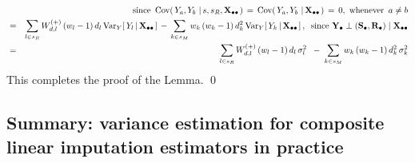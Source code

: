\begin{enumerate}
\begin{eqnarray*}
    &&
        \quad\quad\quad
        \textnormal{since
            \,$
            \textnormal{Cov}\!\left(\,Y_{a},Y_{b}\,\left\vert\,s,s_{R},\mathbf{X}_{\bullet\bullet}\right.\right)
            \,=\,
            \textnormal{Cov}\!\left(\,Y_{a},Y_{b}\,\left\vert\,\mathbf{X}_{\bullet\bullet}\right.\right)
            \,=\,
            0
            $,\, whenever \,$a \neq b$}
    \\
    & = &
        \underset{l \in s_{R}}{\sum}\,
        W^{(+)}_{d,l}\,(w_{l}-1)\,d_{l}\,\textnormal{Var}_{Y}\!\left[\,
            Y_{l}
            \left\vert\,
            \mathbf{X}_{\bullet\bullet}
            \right.
            \right]
        \,-\,
        \underset{k \in s_{M}}{\sum}\,
        w_{k}\,(w_{k}-1)\,d_{k}^{2}\,\textnormal{Var}_{Y}\!\left[\,
            Y_{k}
            \left\vert\,
            \mathbf{X}_{\bullet\bullet}
            \right.
            \right],
        \;\;
        \textnormal{since $\mathbf{Y}_{\bullet} \perp (\mathbf{S}_{\bullet},\mathbf{R}_{\bullet}) \;\vert\; \mathbf{X}_{\bullet\bullet}$}
    \\
    & = &
        \underset{l \in s_{R}}{\sum}\,
        W^{(+)}_{d,l}\,(w_{l}-1)\,d_{l}\,\sigma_{l}^{2}
        \;\;-\;
        \underset{k \in s_{M}}{\sum}\,
        w_{k}\,(w_{k}-1)\,d_{k}^{2}\,\sigma_{k}^{2}
    \end{eqnarray*}
    \vskip 0.1cm
    \noindent
    This completes the proof of the Lemma.
    \qed
\end{enumerate}


\clearpage
\subsection{Summary: variance estimation for composite linear imputation estimators in practice}
\setcounter{theorem}{0}


